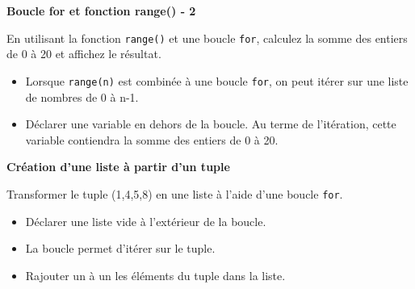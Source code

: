     \begin{Exercice}[5 minutes] \textbf{Boucle for et fonction range() - 2}
      	
      	En utilisant la fonction \lstinline{range()} et une boucle \lstinline{for}, calculez la somme des entiers de 0 à 20 et affichez le résultat.
    
        \begin{conseil}
           \begin{itemize}
           	\item Lorsque \lstinline{range(n)} est combinée à une boucle \lstinline{for}, on peut itérer sur une liste de nombres de 0 à n-1.
           	\item Déclarer une variable en dehors de la boucle. Au terme de l'itération, cette variable contiendra la somme des entiers de 0 à 20.
           \end{itemize}
		     
        \end{conseil}
        
        \begin{solution}
            
        \end{solution}
    \end{Exercice}


   \begin{Exercice}[10 minutes] \textbf{Création d'une liste à partir d'un tuple}
      	
      	Transformer le tuple (1,4,5,8) en une liste à l'aide d'une boucle \lstinline{for}.
    
        \begin{conseil}
           \begin{itemize}
           	\item Déclarer une liste vide à l'extérieur de la boucle.
           	\item La boucle permet d'itérer sur le tuple.
           	\item Rajouter un à un les éléments du tuple dans la liste.
           \end{itemize}
		     
        \end{conseil}
        
        \begin{solution}
            
        \end{solution}
    \end{Exercice}

